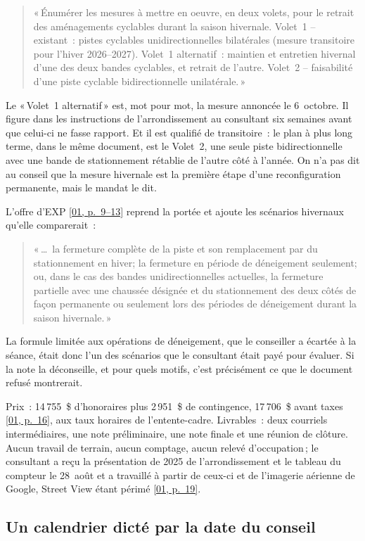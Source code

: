 \documentclass[11pt,letterpaper]{article}
\newcommand{\pagesurl}{https://openmobilitydata.github.io/Terrebonne-access-requests}
\newcommand{\pgl}[3]{\href{\pagesurl/\csname bundle#1\endcsname\#page=#2}{\textsf{\small[#1, p.~#3]}}}
\newcommand{\pg}[2]{\pgl{#1}{#2}{#2}}
\newcommand{\quot}[1]{\begin{quote}\small #1\end{quote}}
\begin{document}
\quot{«\,Énumérer les mesures à mettre en oeuvre, en deux volets, pour le
retrait des aménagements cyclables durant la saison hivernale.
Volet~1 -- existant~: pistes cyclables unidirectionnelles bilatérales
(mesure transitoire pour l'hiver 2026--2027). Volet~1 alternatif~: maintien
et entretien hivernal d'une des deux bandes cyclables, et retrait de
l'autre. Volet~2 -- faisabilité d'une piste cyclable bidirectionnelle
unilatérale.\,»}

Le «\,Volet~1 alternatif\,» est, mot pour mot, la mesure annoncée le
6~octobre. Il figure dans les instructions de l'arrondissement au consultant
six semaines avant que celui-ci ne fasse rapport. Et il est qualifié de
transitoire~: le plan à plus long terme, dans le même document, est le
Volet~2, une seule piste bidirectionnelle avec une bande de stationnement
rétablie de l'autre côté à l'année. On n'a pas dit au conseil que la mesure
hivernale est la première étape d'une reconfiguration permanente, mais le
mandat le dit.

L'offre d'EXP \pgl{01}{9}{9--13} reprend la portée et ajoute les scénarios
hivernaux qu'elle comparerait~:

\quot{«\,\ldots\ la fermeture complète de la piste et son remplacement par du
stationnement en hiver; la fermeture en période de déneigement seulement;
ou, dans le cas des bandes unidirectionnelles actuelles, la fermeture
partielle avec une chaussée désignée et du stationnement des deux côtés
de façon permanente ou seulement lors des périodes de déneigement
durant la saison hivernale.\,»}

La formule limitée aux opérations de déneigement, que le conseiller a
écartée à la séance, était donc l'un des scénarios que le consultant était
payé pour évaluer. Si la note la déconseille, et pour quels motifs, c'est
précisément ce que le document refusé montrerait.

Prix~: 14\,755~\$ d'honoraires plus 2\,951~\$ de contingence, 17\,706~\$
avant taxes \pg{01}{16}, aux taux horaires de l'entente-cadre. Livrables~:
deux courriels intermédiaires, une note préliminaire, une note finale et
une réunion de clôture. Aucun travail de terrain, aucun comptage, aucun
relevé d'occupation\,; le consultant a reçu la présentation de 2025 de
l'arrondissement et le tableau du compteur le 28~août et a travaillé à
partir de ceux-ci et de l'imagerie aérienne de Google, Street View étant
périmé \pg{01}{19}.

\subsection{Un calendrier dicté par la date du conseil}
\end{document}
